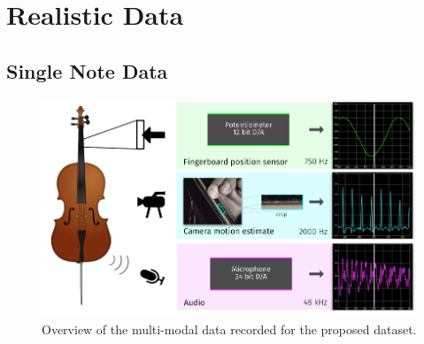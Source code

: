 \section{Realistic Data}

\subsection{Single Note Data}

\begin{figure}[h]
  \centering
  \includegraphics[width=\textwidth]{Chapters/04_Data/figures/teaser.pdf}
  \caption{Overview of the multi-modal data recorded for the proposed dataset.}
\label{fig:teaser}
\end{figure}


